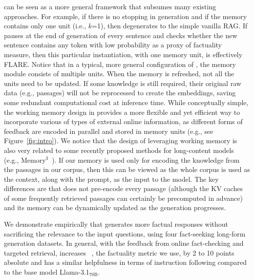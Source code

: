 \model can be seen as a more general framework that subsumes many existing approaches. For example, if there is no stopping in generation and if the memory contains only one unit (i.e., $k$=1), then \model degenerates to the simple vanilla RAG. If \model pauses at the end of generation of every sentence and checks whether the new sentence contains any token with low probability as a proxy of factuality measure, then this particular instantiation, with one memory unit, is effectively FLARE. Notice that in a typical, more general configuration of \model, the memory module consists of multiple units. When the memory is refreshed, not all the units need to be updated. If some knowledge is still required, their original raw data (e.g., passages) will not be reprocessed to create the embeddings, saving some redundant computational cost at inference time.
While conceptually simple, the working memory design in \model provides a more flexible and yet efficient way to incorporate various of types of external online information, as different forms of feedback are encoded in parallel and stored in memory units (e.g., see Figure~\ref{fig:intro}).
We notice that the design of leveraging working memory is also very related to some recently proposed methods for long-content models (e.g., Memory$^3$~\citep{yang2024text}). If our memory is used only for encoding the knowledge from the passages in our corpus, then this can be viewed as the whole corpus is used as the context, along with the prompt, as the input to the model. The key differences are that \model does not pre-encode every passage (although the KV caches of some frequently retrieved passages can certainly be precomputed in advance) and its memory can be dynamically updated as the generation progresses.

We demonstrate empirically that \model generates more factual responses without sacrificing the relevance to the input questions, using four fact-seeking long-form generation datasets. In general, with the feedback from online fact-checking and targeted retrieval, \model increases \vs~\citep{song-etal-2024-veriscore}, the factuality metric we use, by 2 to 10 points absolute and has a similar helpfulness in terms of instruction following compared to the base model Llama-3.1$_\text{70B}$.
